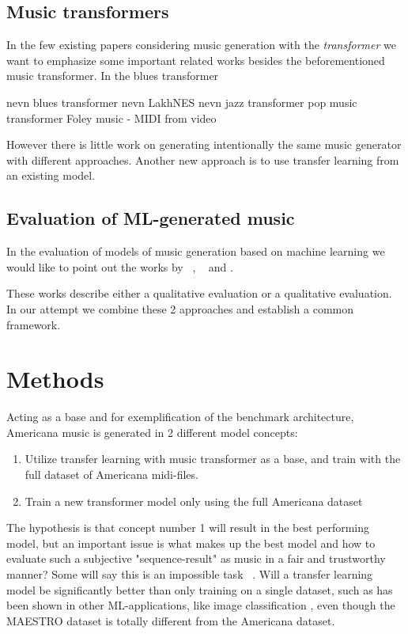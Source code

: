 \documentclass{IEEEtran}
\begin{document}
       \subsection{Music transformers}
       In the few existing papers considering music generation with the \emph{transformer} we want to emphasize some important related works besides the beforementioned music transformer. In the blues transformer 

       nevn blues transformer
       nevn LakhNES
       nevn jazz transformer
       pop music transformer
       Foley music - MIDI from video

       However there is little work on generating intentionally the same music generator with different approaches. Another new approach is to use transfer learning from an existing model.

       \subsection{Evaluation of ML-generated music}
       In the evaluation of models of music generation based on machine learning we would like to point out the works by ~\cite{1030094}, ~\cite{yang2020evaluation} and \cite{wu2020jazz}.

       These works describe either a qualitative evaluation or a qualitative evaluation. In our attempt we combine these 2 approaches and establish a common framework.

    \section{Methods}

        Acting as a base and for exemplification of the benchmark architecture,
        Americana music is generated in 2 different model concepts:
        \begin{enumerate}
            \item Utilize transfer learning with music transformer as a base, and
                    train with the full dataset of Americana midi-files.
            \item Train a new transformer model only using the full Americana dataset
        \end{enumerate} 
        
        The hypothesis is that concept number 1 will result in the best performing model,
        but an important issue is what makes up the best model and how to evaluate such a
        subjective "sequence-result" as music in a fair and trustworthy manner? 
        Some will say this is an impossible task ~\cite{1030094}. Will a transfer learning model be significantly better than only training on a single dataset, such as has been shown in other ML-applications, like image classification \cite{ref}, even though the MAESTRO dataset is totally different from the Americana dataset.
\end{document}
